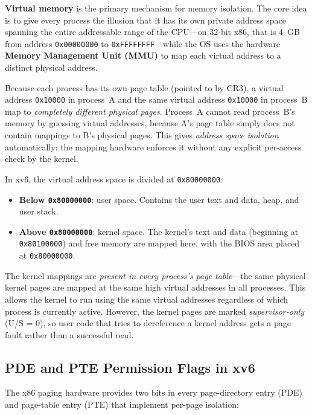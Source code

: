 \documentclass[11pt]{article}
\begin{document}
\textbf{Virtual memory} is the primary mechanism for memory isolation. The core idea is to
give every process the illusion that it has its own private address space spanning the
entire addressable range of the CPU---on 32-bit x86, that is 4~GB from address
\texttt{0x00000000} to \texttt{0xFFFFFFFF}---while the OS uses the hardware
\textbf{Memory Management Unit (MMU)} to map each virtual address to a distinct physical
address.

Because each process has its own page table (pointed to by CR3), a virtual address
\texttt{0x10000} in process~A and the same virtual address \texttt{0x10000} in process~B
map to \emph{completely different physical pages}. Process~A cannot read process~B's memory
by guessing virtual addresses, because A's page table simply does not contain mappings to
B's physical pages. This gives \emph{address space isolation} automatically: the mapping
hardware enforces it without any explicit per-access check by the kernel.

In xv6, the virtual address space is divided at \texttt{0x80000000}:

\begin{itemize}
    \item \textbf{Below \texttt{0x80000000}}: user space. Contains the user text and data,
          heap, and user stack.
    \item \textbf{Above \texttt{0x80000000}}: kernel space. The kernel's text and data
          (beginning at \texttt{0x80100000}) and free memory are mapped here, with the BIOS
          area placed at \texttt{0x80000000}.
\end{itemize}

The kernel mappings are \emph{present in every process's page table}---the same physical
kernel pages are mapped at the same high virtual addresses in all processes. This allows
the kernel to run using the same virtual addresses regardless of which process is currently
active. However, the kernel pages are marked \emph{supervisor-only} (U/S = 0), so user
code that tries to dereference a kernel address gets a page fault rather than a successful
read.

\subsection{PDE and PTE Permission Flags in xv6}

The x86 paging hardware provides two bits in every page-directory entry (PDE) and
page-table entry (PTE) that implement per-page isolation:
\end{document}
